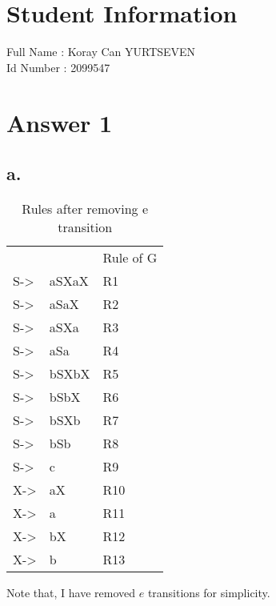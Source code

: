 \documentclass[12pt]{article}
\begin{document}
\section*{Student Information } 
Full Name : Koray Can YURTSEVEN \\
Id Number : 2099547 \\

\section*{Answer 1}

\subsection*{a.}

\begin{table}[H]
\centering
\caption{Rules after removing e transition}
\begin{tabular}{lll}
                 &       & Rule of G \\
S-\textgreater{} & aSXaX & R1        \\
S-\textgreater{} & aSaX  & R2        \\
S-\textgreater{} & aSXa  & R3        \\
S-\textgreater{} & aSa   & R4        \\
S-\textgreater{} & bSXbX & R5        \\
S-\textgreater{} & bSbX  & R6        \\
S-\textgreater{} & bSXb  & R7        \\
S-\textgreater{} & bSb   & R8        \\
S-\textgreater{} & c     & R9        \\
X-\textgreater{} & aX    & R10       \\
X-\textgreater{} & a     & R11       \\
X-\textgreater{} & bX    & R12       \\
X-\textgreater{} & b     & R13      
\end{tabular}
\end{table}

Note that, I have removed $e$ transitions for simplicity.\\
\end{document}
